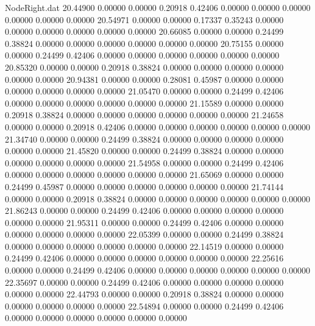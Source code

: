 \begin{filecontents}{NodeRight.dat}
  20.44900    0.00000    0.00000     0.20918    0.42406    0.00000    0.00000    0.00000    0.00000    0.00000    0.00000
  20.54971    0.00000    0.00000     0.17337    0.35243    0.00000    0.00000    0.00000    0.00000    0.00000    0.00000
  20.66085    0.00000    0.00000     0.24499    0.38824    0.00000    0.00000    0.00000    0.00000    0.00000    0.00000
  20.75155    0.00000    0.00000     0.24499    0.42406    0.00000    0.00000    0.00000    0.00000    0.00000    0.00000
  20.85320    0.00000    0.00000     0.20918    0.38824    0.00000    0.00000    0.00000    0.00000    0.00000    0.00000
  20.94381    0.00000    0.00000     0.28081    0.45987    0.00000    0.00000    0.00000    0.00000    0.00000    0.00000
  21.05470    0.00000    0.00000     0.24499    0.42406    0.00000    0.00000    0.00000    0.00000    0.00000    0.00000
  21.15589    0.00000    0.00000     0.20918    0.38824    0.00000    0.00000    0.00000    0.00000    0.00000    0.00000
  21.24658    0.00000    0.00000     0.20918    0.42406    0.00000    0.00000    0.00000    0.00000    0.00000    0.00000
  21.34740    0.00000    0.00000     0.24499    0.38824    0.00000    0.00000    0.00000    0.00000    0.00000    0.00000
  21.45820    0.00000    0.00000     0.24499    0.38824    0.00000    0.00000    0.00000    0.00000    0.00000    0.00000
  21.54958    0.00000    0.00000     0.24499    0.42406    0.00000    0.00000    0.00000    0.00000    0.00000    0.00000
  21.65069    0.00000    0.00000     0.24499    0.45987    0.00000    0.00000    0.00000    0.00000    0.00000    0.00000
  21.74144    0.00000    0.00000     0.20918    0.38824    0.00000    0.00000    0.00000    0.00000    0.00000    0.00000
  21.86243    0.00000    0.00000     0.24499    0.42406    0.00000    0.00000    0.00000    0.00000    0.00000    0.00000
  21.95311    0.00000    0.00000     0.24499    0.42406    0.00000    0.00000    0.00000    0.00000    0.00000    0.00000
  22.05399    0.00000    0.00000     0.24499    0.38824    0.00000    0.00000    0.00000    0.00000    0.00000    0.00000
  22.14519    0.00000    0.00000     0.24499    0.42406    0.00000    0.00000    0.00000    0.00000    0.00000    0.00000
  22.25616    0.00000    0.00000     0.24499    0.42406    0.00000    0.00000    0.00000    0.00000    0.00000    0.00000
  22.35697    0.00000    0.00000     0.24499    0.42406    0.00000    0.00000    0.00000    0.00000    0.00000    0.00000
  22.44793    0.00000    0.00000     0.20918    0.38824    0.00000    0.00000    0.00000    0.00000    0.00000    0.00000
  22.54894    0.00000    0.00000     0.24499    0.42406    0.00000    0.00000    0.00000    0.00000    0.00000    0.00000

\end{filecontents}
